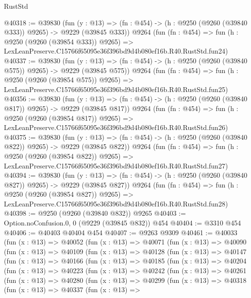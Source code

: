 \begin{lexlean}{RustStd}
\begin{coremodule}
@40318 := @39830
    (fun (y : @13) => (fn : @454) -> (h : @9250 (@9260 (@39840 @333)) @9265) -> @9229 (@39845 @333))
    @9264
    (fun (fn : @454) =>
    fun (h : @9250 (@9260 (@39854 @333)) @9265) =>
    LexLeanPreserve.C15766f65095e36f396bd9d4b080ef16b.R40.RustStd.fun24)
@40337 := @39830
    (fun (y : @13) => (fn : @454) -> (h : @9250 (@9260 (@39840 @575)) @9265) -> @9229 (@39845 @575))
    @9264
    (fun (fn : @454) =>
    fun (h : @9250 (@9260 (@39854 @575)) @9265) =>
    LexLeanPreserve.C15766f65095e36f396bd9d4b080ef16b.R40.RustStd.fun25)
@40356 := @39830
    (fun (y : @13) => (fn : @454) -> (h : @9250 (@9260 (@39840 @817)) @9265) -> @9229 (@39845 @817))
    @9264
    (fun (fn : @454) =>
    fun (h : @9250 (@9260 (@39854 @817)) @9265) =>
    LexLeanPreserve.C15766f65095e36f396bd9d4b080ef16b.R40.RustStd.fun26)
@40375 := @39830
    (fun (y : @13) => (fn : @454) -> (h : @9250 (@9260 (@39840 @822)) @9265) -> @9229 (@39845 @822))
    @9264
    (fun (fn : @454) =>
    fun (h : @9250 (@9260 (@39854 @822)) @9265) =>
    LexLeanPreserve.C15766f65095e36f396bd9d4b080ef16b.R40.RustStd.fun27)
@40394 := @39830
    (fun (y : @13) => (fn : @454) -> (h : @9250 (@9260 (@39840 @827)) @9265) -> @9229 (@39845 @827))
    @9264
    (fun (fn : @454) =>
    fun (h : @9250 (@9260 (@39854 @827)) @9265) =>
    LexLeanPreserve.C15766f65095e36f396bd9d4b080ef16b.R40.RustStd.fun28)
@40398 := @9250 (@9260 (@39840 @832)) @9265
@40403 := Option.noConfusion.{0, 0} (@9229 (@39845 @832)) @454
@40404 := @3310 @454
@40406 := @40403 @40404 @454
@40407 := @9263 @9309
@40461 := @40033
    (fun (x : @13) =>
    @40052
      (fun (x : @13) =>
      @40071
        (fun (x : @13) =>
        @40090
          (fun (x : @13) =>
          @40109
            (fun (x : @13) =>
            @40128
              (fun (x : @13) =>
              @40147
                (fun (x : @13) =>
                @40166
                  (fun (x : @13) =>
                  @40185
                    (fun (x : @13) =>
                    @40204
                      (fun (x : @13) =>
                      @40223
                        (fun (x : @13) =>
                        @40242
                          (fun (x : @13) =>
                          @40261
                            (fun (x : @13) =>
                            @40280
                              (fun (x : @13) =>
                              @40299
                                (fun (x : @13) =>
                                @40318
                                  (fun (x : @13) =>
                                  @40337
                                    (fun (x : @13) =>

\end{coremodule}
\end{lexlean}

